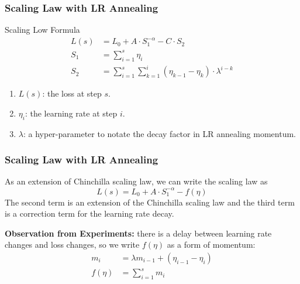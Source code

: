 \documentclass[aspectratio=169]{beamer}
\begin{document}
\begin{frame}
    \frametitle{Scaling Law with LR Annealing}
    \begin{block}{Scaling Low Formula}
        \begin{equation}
            \label{eq:scaling_low}
            \begin{aligned}
                L(s) &= L_0 + A\cdot S_1^{-\alpha} - C\cdot S_2 \\
                S_1 &= \sum_{i=1}^{s} \eta_i \\
                S_2 &= \sum_{i=1}^{s} \sum_{k=1}^{i} (\eta_{k-1} -
                \eta_k)\cdot\lambda^{i-k}
            \end{aligned}
        \end{equation}
    \end{block}

    \begin{enumerate}
        \item $L(s)$: the loss at step $s$.
        \item $\eta_i$: the learning rate at step $i$.
        \item $\lambda$: a hyper-parameter to notate the decay factor
            in LR annealing momentum.
    \end{enumerate}
\end{frame}

\begin{frame}
    \frametitle{Scaling Law with LR Annealing}
    As an extension of Chinchilla scaling law, we can write the scaling law as
    \begin{equation}
        L(s) = L_0 + A\cdot S_1^{-\alpha} - f(\eta)
    \end{equation}
    The second term is an extension of the Chinchilla scaling law and
    the third term is a correction term for the learning rate decay.

    \textbf{Observation from Experiments:} there is a delay between
    learning rate
    changes and loss changes, so we write $f(\eta)$ as a form of momentum:
    \begin{equation}
        \begin{aligned}
            m_i &= \lambda m_{i-1} + (\eta_{i-1} - \eta_i) \\
            f(\eta) &= \sum_{i=1}^{s} m_i
        \end{aligned}
    \end{equation}
\end{frame}
\end{document}
